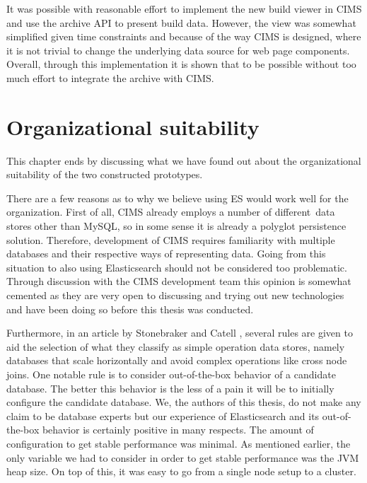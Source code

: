 It was possible with reasonable effort to implement the new build viewer in CIMS and use the archive API to present build data. However, the view was somewhat simplified given time constraints and because of the way CIMS is designed, where it is not trivial to change the underlying data source for web page components. Overall, through this implementation it is shown that to be possible without too much effort to integrate the archive with CIMS.



\section{Organizational suitability}
This chapter ends by discussing what we have found out about the organizational suitability of the two constructed prototypes.


There are a few reasons as to why we believe using ES would work well for the organization. First of all, CIMS already employs a number of different\footnotemark\ data stores other than MySQL, so in some sense it is already a polyglot persistence solution. Therefore, development of CIMS requires familiarity with multiple databases and their respective ways of representing data. Going from this situation to also using Elasticsearch should not be considered too problematic. Through discussion with the CIMS development team this opinion is somewhat cemented as they are very open to discussing and trying out new technologies and have been doing so before this thesis was conducted. 


Furthermore, in an article by Stonebraker and Catell \cite{10rules}, several rules are given to aid the selection of what they classify as simple operation data stores, namely databases that scale horizontally and avoid complex operations like cross node joins. One notable rule is to consider out-of-the-box behavior of a candidate database. The better this behavior is the less of a pain it will be to initially configure the candidate database. We, the authors of this thesis, do not make any claim to be database experts but our experience of Elasticsearch and its out-of-the-box behavior is certainly positive in many respects. The amount of configuration to get stable performance was minimal. As mentioned earlier, the only variable we had to consider in order to get stable performance was the JVM heap size. On top of this, it was easy to go from a single node setup to a cluster. 

